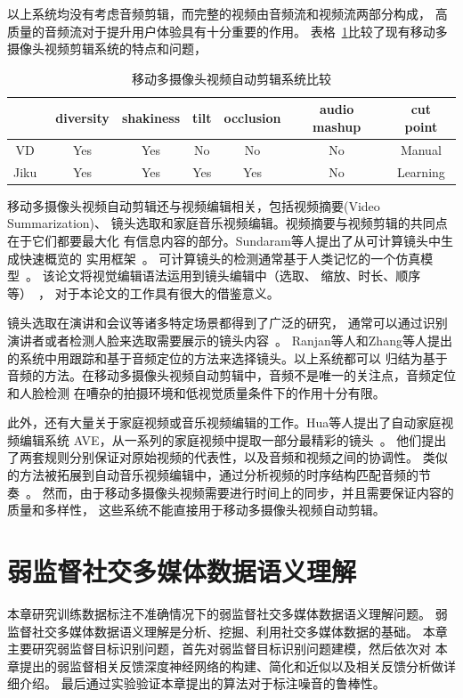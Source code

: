 \documentclass[doctor]{ustcthesis}
\begin{document}
以上系统均没有考虑音频剪辑，而完整的视频由音频流和视频流两部分构成，
高质量的音频流对于提升用户体验具有十分重要的作用。
表格~\ref{tab:mashup-comp}比较了现有移动多摄像头视频剪辑系统的特点和问题，
\begin{table}[t]
    \centering
    \caption{移动多摄像头视频自动剪辑系统比较} \label{tab:mashup-comp}
    \begin{tabular}{|c|c|c|c|c|c|c|}
    \hline
    & diversity & shakiness & tilt  & occlusion  & audio mashup  & cut point \\
    \hline
    VD~\cite{DBLP:conf/mm/ShresthaWWBA10} & Yes & Yes & No & No & No & Manual \\
    \hline
    Jiku~\cite{DBLP:conf/mm/SainiGYO12} & Yes & Yes & Yes & Yes & No & Learning \\
    \hline
\end{tabular}
\end{table}

移动多摄像头视频自动剪辑还与视频编辑相关，包括视频摘要(Video Summarization)、
镜头选取和家庭音乐视频编辑。视频摘要与视频剪辑的共同点在于它们都要最大化
有信息内容的部分。Sundaram等人提出了从可计算镜头中生成快速概览的
实用框架~\cite{sundaram2002computable}。
可计算镜头的检测通常基于人类记忆的一个仿真模型~\cite{sundaram2002computable}。
该论文将视觉编辑语法运用到镜头编辑中（选取、 缩放、时长、顺序等）~\cite{CinemaElements1982}，
对于本论文的工作具有很大的借鉴意义。

镜头选取在演讲和会议等诸多特定场景都得到了广泛的研究，
通常可以通过识别演讲者或者检测人脸来选取需要展示的镜头内容~\cite{DBLP:journals/ieeemm/LampiKBE08,sumec2006multi}。
Ranjan等人和Zhang等人提出的系统中用跟踪和基于音频定位的方法来选择镜头。以上系统都可以
归结为基于音频的方法。在移动多摄像头视频自动剪辑中，音频不是唯一的关注点，音频定位和人脸检测
在嘈杂的拍摄环境和低视觉质量条件下的作用十分有限。

此外，还有大量关于家庭视频或音乐视频编辑的工作。Hua等人提出了自动家庭视频编辑系统
AVE，从一系列的家庭视频中提取一部分最精彩的镜头~\cite{DBLP:conf/mm/HuaLZ03}。
他们提出了两套规则分别保证对原始视频的代表性，以及音频和视频之间的协调性。
类似的方法被拓展到自动音乐视频编辑中，通过分析视频的时序结构匹配音频的节奏~\cite{DBLP:conf/mm/HuaLZ04a}。
然而，由于移动多摄像头视频需要进行时间上的同步，并且需要保证内容的质量和多样性，
这些系统不能直接用于移动多摄像头视频自动剪辑。


\chapter{弱监督社交多媒体数据语义理解}
本章研究训练数据标注不准确情况下的弱监督社交多媒体数据语义理解问题。
弱监督社交多媒体数据语义理解是分析、挖掘、利用社交多媒体数据的基础。
本章主要研究弱监督目标识别问题，首先对弱监督目标识别问题建模，然后依次对
本章提出的弱监督相关反馈深度神经网络的构建、简化和近似以及相关反馈分析做详细介绍。
最后通过实验验证本章提出的算法对于标注噪音的鲁棒性。
\end{document}
